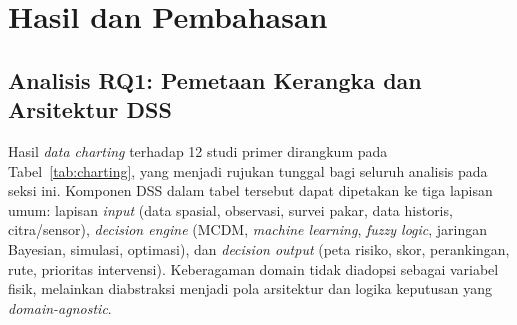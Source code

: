 \documentclass[10pt,twocolumn,a4paper]{article}
\begin{document}
\section{Hasil dan Pembahasan}
\subsection{Analisis RQ1: Pemetaan Kerangka dan Arsitektur DSS}
Hasil \textit{data charting} terhadap 12 studi primer \cite{wang,gonz,feiz,ahmed,choi,kanj,kab,baddour,alma,shid,zheng,yuhang} dirangkum pada Tabel~\ref{tab:charting}, yang menjadi rujukan tunggal bagi seluruh analisis pada seksi ini. Komponen DSS dalam tabel tersebut dapat dipetakan ke tiga lapisan umum: lapisan \textit{input} (data spasial, observasi, survei pakar, data historis, citra/sensor), \textit{decision engine} (MCDM, \textit{machine learning}, \textit{fuzzy logic}, jaringan Bayesian, simulasi, optimasi), dan \textit{decision output} (peta risiko, skor, perankingan, rute, prioritas intervensi). Keberagaman domain tidak diadopsi sebagai variabel fisik, melainkan diabstraksi menjadi pola arsitektur dan logika keputusan yang \textit{domain-agnostic}.
\end{document}
